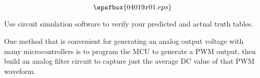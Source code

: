 

$$\epsfbox{04019x01.eps}$$

\vfil \eject






Use circuit simulation software to verify your predicted and actual truth tables.







One method that is convenient for generating an analog output voltage with many microcontrollers is to program the MCU to generate a PWM output, then build an analog filter circuit to capture just the average DC value of that PWM waveform.




